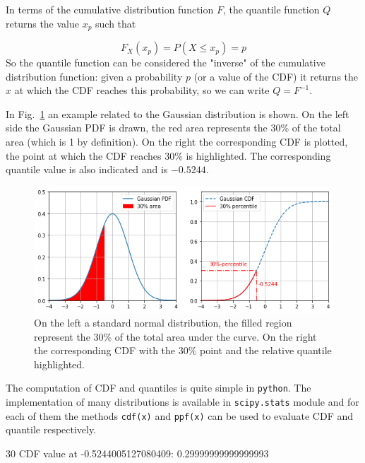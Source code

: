 In terms of the cumulative distribution function $F$, the quantile function $Q$ returns the value $x_p$ such that 

\begin{equation}
F_{X}(x_p)=P(X\le x_p)=p
\end{equation}
So the quantile function can be considered the "inverse" of the cumulative distribution function: given a probability $p$ (or a value of the CDF) it returns the $x$ at which the CDF reaches this probability, so we can write $Q=F^{-1}$.

In Fig.~\ref{fig:percentile} an example related to the Gaussian distribution is shown. On the left side the Gaussian PDF is drawn, the red area represents the 30\% of the total area (which is 1 by definition). On the right the corresponding CDF is plotted, the point at which the CDF reaches 30\% is highlighted. The corresponding quantile value is also indicated and is $-0.5244$.

\begin{figure}[htb]
	\centering
	\includegraphics[width=1.\textwidth]{figures/percentile.png}
	\caption{On the left a standard normal distribution, the filled region represent the 30\% of the total area under the curve. On the right the corresponding CDF with the 30\% point and the relative quantile highlighted.}
	\label{fig:percentile}
\end{figure}

The computation of CDF and quantiles is quite simple in \texttt{python}. The implementation of many distributions is available in \texttt{scipy.stats} module and for each of them the methods \texttt{cdf(x)} and \texttt{ppf(x)} can be used to evaluate CDF and quantile respectively.


\begin{ioutput}
30%
CDF value at -0.5244005127080409: 0.29999999999999993
\end{ioutput}

